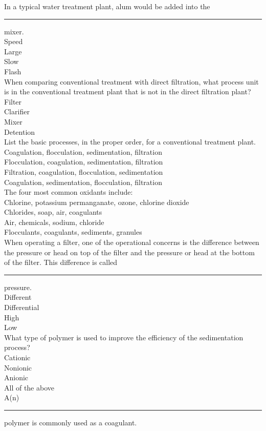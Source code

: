 In a typical water treatment plant, alum would be added into the \rule{2cm}{0.3pt} mixer.\\
Speed\\
Large\\
Slow\\
Flash\\
When comparing conventional treatment with direct filtration, what process unit is in the conventional treatment plant that is not in the direct filtration plant?\\
Filter\\
Clarifier\\
Mixer\\
Detention\\
List the basic processes, in the proper order, for a conventional treatment plant.\\
Coagulation, flocculation, sedimentation, filtration\\
Flocculation, coagulation, sedimentation, filtration\\
Filtration, coagulation, flocculation, sedimentation\\
Coagulation, sedimentation, flocculation, filtration\\
The four most common oxidants include:\\
Chlorine, potassium permanganate, ozone, chlorine dioxide\\
Chlorides, soap, air, coagulants\\
Air, chemicals, sodium, chloride\\
Flocculants, coagulants, sediments, granules\\
 When operating a filter, one of the operational concerns is the difference between the pressure or head on top of the filter and the pressure or head at the bottom of the filter. This difference is called \rule{2cm}{0.3pt} pressure.\\
Different\\
Differential\\
High\\
Low\\
 What type of polymer is used to improve the efficiency of the sedimentation\\
process?\\
Cationic\\
Nonionic\\
Anionic\\
All of the above\\
A(n) \rule{2cm}{0.3pt} polymer is commonly used as a coagulant.\\
